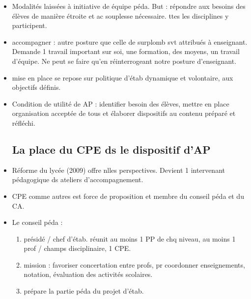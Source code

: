 \documentclass[12pt]{report}
\begin{document}
\begin{itemize}
\item Modalités laissées à initiative de équipe péda. But : répondre aux besoins des élèves de manière étroite et ac souplesse nécessaire. ttes les disciplines y participent.\\

\item accompagner : autre posture que celle de surplomb svt attribués à enseignant. Demande 1 travail important sur soi, une formation, des moyens, un travail d'équipe. Ne peut se faire qu'en réinterrogeant notre posture d'enseignant. \\

\item mise en place se repose sur politique d'étab dynamique et volontaire, aux objectifs définis.\\

\item Condition de utilité de AP : identifier besoin des élèves, mettre en place organisation acceptée de tous et élaborer dispositifs au contenu préparé et réfléchi.\\

\subsection{La place du CPE ds le dispositif d'AP}

\item Réforme du lycée (2009) offre nlles perspectives. Devient 1 intervenant pédagogique ds ateliers d'accompagnement. \\
\item CPE comme autres est force de proposition et membre du conseil péda et du CA.

\item Le conseil péda : 
\begin{enumerate}
\item présidé / chef d'étab. réunit au moins 1 PP de chq niveau, au moins 1 prof / champs disciplinaire, 1 CPE. \\
\item mission : favoriser concertation entre profs, pr coordonner enseignements, notation, évaluation des activités scolaires. \\
\item prépare la partie péda du projet d'étab. \\


\end{enumerate}



\end{itemize}
\end{document}
